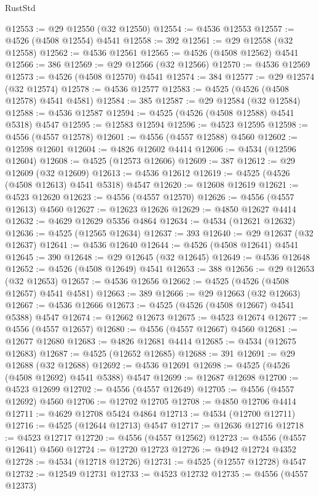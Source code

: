 \begin{lexlean}{RustStd}
\begin{coremodule}
{\begin{coremodule}
{{{{{{{{{{{{{{{{{{{{{{{{{{{{{{{{{{{{{{{{{{{{{{{{{{{{{{{@12553 := @29 @12550 (@32 @12550)
@12554 := @4536 @12553
@12557 := @4526 (@4508 @12554) @4541
@12558 := 392
@12561 := @29 @12558 (@32 @12558)
@12562 := @4536 @12561
@12565 := @4526 (@4508 @12562) @4541
@12566 := 386
@12569 := @29 @12566 (@32 @12566)
@12570 := @4536 @12569
@12573 := @4526 (@4508 @12570) @4541
@12574 := 384
@12577 := @29 @12574 (@32 @12574)
@12578 := @4536 @12577
@12583 := @4525 (@4526 (@4508 @12578) @4541 @4581)
@12584 := 385
@12587 := @29 @12584 (@32 @12584)
@12588 := @4536 @12587
@12594 := @4525 (@4526 (@4508 @12588) @4541 @5318) @4547
@12595 := @12583 @12594
@12596 := @4523 @12595
@12598 := @4556 (@4557 @12578)
@12601 := @4556 (@4557 @12588) @4560
@12602 := @12598 @12601
@12604 := @4826 @12602 @4414
@12606 := @4534 (@12596 @12604)
@12608 := @4525 (@12573 @12606)
@12609 := 387
@12612 := @29 @12609 (@32 @12609)
@12613 := @4536 @12612
@12619 := @4525 (@4526 (@4508 @12613) @4541 @5318) @4547
@12620 := @12608 @12619
@12621 := @4523 @12620
@12623 := @4556 (@4557 @12570)
@12626 := @4556 (@4557 @12613) @4560
@12627 := @12623 @12626
@12629 := @4850 @12627 @4414
@12632 := @4629 @12629 @5356 @4864
@12634 := @4534 (@12621 @12632)
@12636 := @4525 (@12565 @12634)
@12637 := 393
@12640 := @29 @12637 (@32 @12637)
@12641 := @4536 @12640
@12644 := @4526 (@4508 @12641) @4541
@12645 := 390
@12648 := @29 @12645 (@32 @12645)
@12649 := @4536 @12648
@12652 := @4526 (@4508 @12649) @4541
@12653 := 388
@12656 := @29 @12653 (@32 @12653)
@12657 := @4536 @12656
@12662 := @4525 (@4526 (@4508 @12657) @4541 @4581)
@12663 := 389
@12666 := @29 @12663 (@32 @12663)
@12667 := @4536 @12666
@12673 := @4525 (@4526 (@4508 @12667) @4541 @5388) @4547
@12674 := @12662 @12673
@12675 := @4523 @12674
@12677 := @4556 (@4557 @12657)
@12680 := @4556 (@4557 @12667) @4560
@12681 := @12677 @12680
@12683 := @4826 @12681 @4414
@12685 := @4534 (@12675 @12683)
@12687 := @4525 (@12652 @12685)
@12688 := 391
@12691 := @29 @12688 (@32 @12688)
@12692 := @4536 @12691
@12698 := @4525 (@4526 (@4508 @12692) @4541 @5388) @4547
@12699 := @12687 @12698
@12700 := @4523 @12699
@12702 := @4556 (@4557 @12649)
@12705 := @4556 (@4557 @12692) @4560
@12706 := @12702 @12705
@12708 := @4850 @12706 @4414
@12711 := @4629 @12708 @5424 @4864
@12713 := @4534 (@12700 @12711)
@12716 := @4525 (@12644 @12713) @4547
@12717 := @12636 @12716
@12718 := @4523 @12717
@12720 := @4556 (@4557 @12562)
@12723 := @4556 (@4557 @12641) @4560
@12724 := @12720 @12723
@12726 := @4942 @12724 @4352
@12728 := @4534 (@12718 @12726)
@12731 := @4525 (@12557 @12728) @4547
@12732 := @12549 @12731
@12733 := @4523 @12732
@12735 := @4556 (@4557 @12373)
}}}}}}}}}}}}}}}}}}}}}}}}}}}}}}}}}}}}}}}}}}}}}}}}}}}}}}}
\end{coremodule}}
\end{coremodule}
\end{lexlean}
